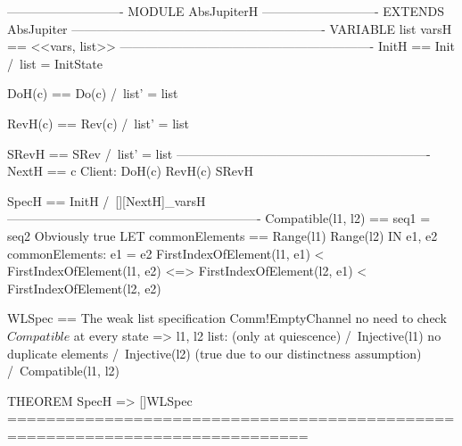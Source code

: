 \documentclass{article}
\begin{document}
\begin{tla}
---------------------------- MODULE AbsJupiterH ----------------------------
EXTENDS AbsJupiter 
-------------------------------------------------------------
VARIABLE list
varsH == <<vars, list>>
-------------------------------------------------------------
InitH == Init /\ list = {InitState}

DoH(c) == Do(c) /\ list' = list 

RevH(c) == Rev(c) /\ list' = list 

SRevH == SRev /\ list' = list 
-------------------------------------------------------------
NextH == \/ \E c \in Client: DoH(c) \/ RevH(c)
         \/ SRevH

SpecH == InitH /\ [][NextH]_varsH
-------------------------------------------------------------
Compatible(l1, l2) ==
    \/ seq1 = seq2 \* Obviously true
    \/ LET commonElements == Range(l1) \cap Range(l2)
       IN \A e1, e2 \in commonElements:
            \/ e1 = e2
            \/ FirstIndexOfElement(l1, e1) < FirstIndexOfElement(l1, e2) 
               <=> FirstIndexOfElement(l2, e1) < FirstIndexOfElement(l2, e2)

WLSpec == \* The weak list specification
    Comm!EmptyChannel \* no need to check $Compatible$ at every state
        => \A l1, l2 \in list: \* (only at quiescence)
            /\ Injective(l1) \* no duplicate elements
            /\ Injective(l2) \* (true due to our distinctness assumption)
            /\ Compatible(l1, l2)

THEOREM SpecH => []WLSpec
=============================================================================
\end{tla}
\end{document}
